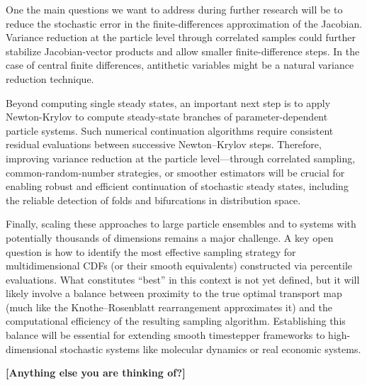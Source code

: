 \documentclass{article}
\begin{document}
One the main questions we want to address during further research will be to reduce the stochastic error in the finite-differences approximation of the Jacobian. Variance reduction at the particle level through correlated samples could further stabilize Jacobian-vector products and allow smaller finite-difference steps. In the case of central finite differences, antithetic variables might be a natural variance reduction technique. 

Beyond computing single steady states, an important next step is to apply Newton-Krylov to compute steady-state branches of parameter-dependent particle systems. Such numerical continuation algorithms require consistent residual evaluations between successive Newton–Krylov steps. Therefore, improving variance reduction at the particle level—through correlated sampling, common-random-number strategies, or smoother estimators will be crucial for enabling robust and efficient continuation of stochastic steady states, including the reliable detection of folds and bifurcations in distribution space.

Finally, scaling these approaches to large particle ensembles and to systems with potentially thousands of dimensions remains a major challenge. A key open question is how to identify the most effective sampling strategy for multidimensional CDFs (or their smooth equivalents) constructed via percentile evaluations. What constitutes “best” in this context is not yet defined, but it will likely involve a balance between proximity to the true optimal transport map (much like the Knothe–Rosenblatt rearrangement approximates it) and the computational efficiency of the resulting sampling algorithm. Establishing this balance will be essential for extending smooth timestepper frameworks to high-dimensional stochastic systems like molecular dynamics or real economic systems.

\textbf{[Anything else you are thinking of?]}

\appendix
\end{document}
